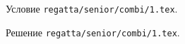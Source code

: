 Условие \texttt{regatta/senior/combi/1.tex}.

\solution Решение \texttt{regatta/senior/combi/1.tex}.
